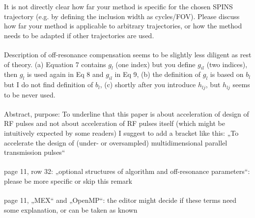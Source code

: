 \documentclass[11pt]{article}
\begin{document}
 It is not directly clear how far your method is specific for the chosen SPINS trajectory (e.g. by defining the inclusion width as cycles/FOV). Please discuss how far your method is applicable to arbitrary trajectories, or how the method needs to be adapted if other trajectories are used.
\\[0.2em]
\indent{\it \textcolor{blue}{The algorithm makes no assumptions about the specific trajectory used, 
and we have clarified this in the Discussion.
The code we provide should work for any 2D or 3D trajectory, and could be extended to any number of dimensions. 
We have also clarified in the Theory section that by `cycles/FOV' we mean phase cycles over the excitation FOV;
this is a general measure that is not specific to the SPINS trajectory.}}
\\[1.2em]

 Description of off-resonance compensation seems to be slightly less diligent as rest of theory. (a) Equation 7 contains $g_l$ (one index) but you define $g_{il}$ (two indices), then $g_l$ is used again in Eq 8 and $g_{il}$ in Eq 9, (b) the definition of $g_l$ is based on $b_l$ but I do not find definition of $b_l$, (c) shortly after you introduce $h_{lj}$, but $h_{lj}$ seems to be never used.
\\[0.2em]
\indent{\it \textcolor{blue}{Thank you for noticing the inconsistencies in this section; we agree and have revised the section to simplify and clarify it. It is now also a bit shorter.}}
\\[1.2em]

 Abstract, purpose: To underline that this paper is about acceleration of design of RF pulses and not about acceleration of RF pulses itself (which might be intuitively expected by some readers) I suggest to add a bracket like this: „To accelerate the design of (under- or oversampled) multidimensional parallel transmission pulses“
\\[0.2em]
\indent{\it \textcolor{blue}{We agree and have made this addition.}}
\\[1.2em]

 page 11, row 32: „optional structures of algorithm and off-resonance parameters“: please be more specific or skip this remark
\\[0.2em]
\indent{\it \textcolor{blue}{We have skipped this remark to save word count.}}
\\[1.2em]

 page 11, „MEX“ and „OpenMP“: the editor might decide if these terms need some explanation, or can be taken as known
\\[0.2em]
\indent{\it \textcolor{blue}{We have defined each of these acronyms.}}
\\[1.2em]
\end{document}
